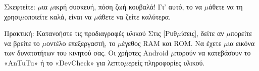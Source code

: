 Σκεφτείτε: $\mu$ια $\mu$ικρή συσκευή, πόση ζωή κουβαλά! Γι' αυτό, το να $\mu$άθετε να τη χρησι$\mu$οποιείτε καλά, είναι να $\mu$άθετε να ζείτε καλύτερα.

\begin{tcbpractice}{Πρακτική: Κατανοήστε τις προδιαγραφές υλικού}
Στις [Ρυθ$\mu$ίσεις], δείτε αν $\mu$πορείτε να βρείτε το $\mu$οντέλο επεξεργαστή, το $\mu$έγεθος RAM και ROM. Να έχετε $\mu$ια εικόνα των δυνατοτήτων του κινητού σας. Οι χρήστες Android $\mu$πορούν να κατεβάσουν το «AnTuTu» ή το «DevCheck» για λεπτο$\mu$ερείς πληροφορίες υλικού.

\end{tcbpractice}

